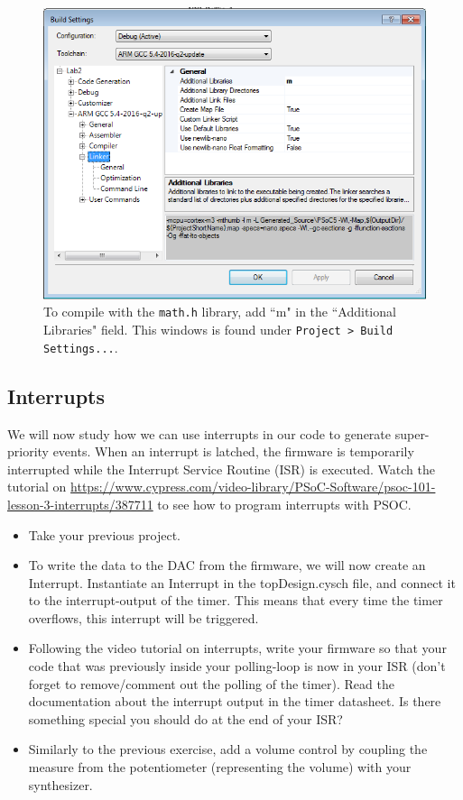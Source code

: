 \documentclass[11pt,a4paper]{article}
\theoremstyle{definition}%
\begin{document}
\begin{figure}
\centering
\includegraphics[width=12cm]{linker-settings.png}
\caption{To compile with the \texttt{math.h} library, add ``m" in the ``Additional Libraries" field. This windows is found under \texttt{Project > Build Settings...}.}
\label{fig:linker}
\end{figure}




\subsection{Interrupts}

We will now study how we can use interrupts in our code to generate super-priority events. When an interrupt is latched, the firmware is temporarily interrupted while the Interrupt Service Routine (ISR) is executed. Watch the tutorial on \url{https://www.cypress.com/video-library/PSoC-Software/psoc-101-lesson-3-interrupts/387711} to see how to program interrupts with PSOC. 
\begin{itemize}
	\item Take your previous project. 
	\item To write the data to the DAC from the firmware, we will now create an Interrupt. Instantiate an Interrupt in the topDesign.cysch file, and connect it to the interrupt-output of the timer. This means that every time the timer overflows, this interrupt will be triggered. 
	\item Following the video tutorial on interrupts, write your firmware so that your code that was previously inside your polling-loop is now in your ISR (don't forget to remove/comment out the polling of the timer). Read the documentation about the interrupt output in the timer datasheet. Is there something special you should do at the end of your ISR? 
	\item Similarly to the previous exercise, add a volume control by coupling the measure from the potentiometer (representing the volume) with your synthesizer.
\end{itemize}
	
\end{document}
